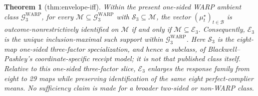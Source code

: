 \documentclass{article}
\newtheorem{theorem}{Theorem}
\begin{document}
\begin{theorem}[thm:envelope-iff]\label{thm:envelope-iff}
Within the present one-sided WARP ambient class \(\mathcal G^{\mathrm{WARP}}_3\), for every \(\mathcal M\subseteq\mathcal G^{\mathrm{WARP}}_3\) with \(\mathcal S_3\subseteq\mathcal M\), the vector \((\mu_t^\star)_{t\in\mathcal B}\) is outcome-nonrestrictively identified on \(\mathcal M\) if and only if \(\mathcal M\subseteq\mathcal E_3\). Consequently, \(\mathcal E_3\) is the unique inclusion-maximal such support within \(\mathcal G^{\mathrm{WARP}}_3\). Here \(\mathcal S_3\) is the eight-map one-sided three-factor specialization, and hence a subclass, of Blackwell--Pashley's coordinate-specific receipt model; it is not that published class itself. Relative to this one-sided three-factor slice, \(\mathcal E_3\) enlarges the response family from eight to 29 maps while preserving identification of the same eight perfect-complier means. No sufficiency claim is made for a broader two-sided or non-WARP class.
\end{theorem}
\end{document}
